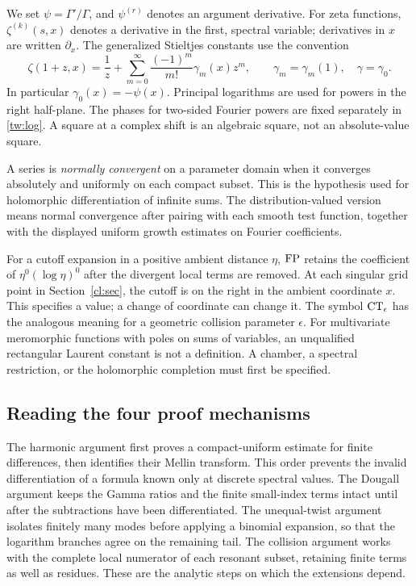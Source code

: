 We set $\psi=\Gamma'/\Gamma$, and $\psi^{(r)}$ denotes an
argument derivative. For zeta functions, $\zeta^{(k)}(s,x)$
denotes a derivative in the first, spectral variable; derivatives
in $x$ are written $\partial_x$. The generalized Stieltjes
constants use the convention
\begin{equation}\label{scope:stieltjes}
 \zeta(1+z,x)=\frac1z+
       \sum_{m=0}^{\infty}\frac{(-1)^m}{m!}\gamma_m(x)z^m,
 \qquad \gamma_m=\gamma_m(1),\quad \gamma=\gamma_0.
\end{equation}
In particular $\gamma_0(x)=-\psi(x)$.
Principal logarithms are used for powers in the right half-plane.
The phases for two-sided Fourier powers are fixed separately
in \eqref{tw:log}. A square at a complex shift is an algebraic
square, not an absolute-value square.

A series is \emph{normally convergent} on a parameter domain when
it converges absolutely and uniformly on each compact subset.
This is the hypothesis used for holomorphic differentiation of
infinite sums. The distribution-valued version means normal
convergence after pairing with each smooth test function, together
with the displayed uniform growth estimates on Fourier coefficients.

For a cutoff expansion in a positive ambient distance $\eta$,
$\operatorname{FP}$ retains the coefficient of $\eta^0(\log\eta)^0$ after
the divergent local terms are removed. At each singular grid
point in Section~\ref{cl:sec}, the cutoff is on the right in
the ambient coordinate $x$. This specifies a value; a change of
coordinate can change it. The symbol $\operatorname{CT}_\epsilon$ has the
analogous meaning for a geometric collision parameter $\epsilon$.
For multivariate meromorphic functions with poles on sums of
variables, an unqualified rectangular Laurent constant is not a
definition. A chamber, a spectral restriction, or the holomorphic
completion must first be specified.

\subsection{Reading the four proof mechanisms}

The harmonic argument first proves a compact-uniform estimate for
finite differences, then identifies their Mellin transform. This
order prevents the invalid differentiation of a formula known only
at discrete spectral values. The Dougall argument keeps the Gamma
ratios and the finite small-index terms intact until after the
subtractions have been differentiated. The unequal-twist argument
isolates finitely many modes before applying a binomial expansion,
so that the logarithm branches agree on the remaining tail.
The collision argument works with the complete local numerator of
each resonant subset, retaining finite terms as well as residues.
These are the analytic steps on which the extensions depend.
